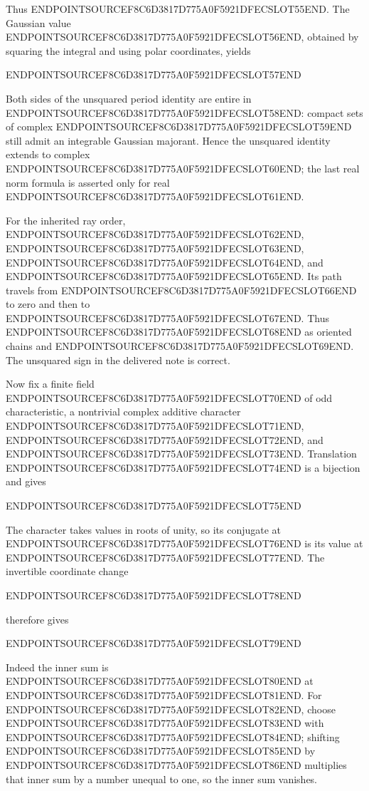 Thus ENDPOINTSOURCEF8C6D3817D775A0F5921DFECSLOT55END. The Gaussian value ENDPOINTSOURCEF8C6D3817D775A0F5921DFECSLOT56END, obtained by squaring the integral and using polar coordinates, yields

ENDPOINTSOURCEF8C6D3817D775A0F5921DFECSLOT57END

Both sides of the unsquared period identity are entire in ENDPOINTSOURCEF8C6D3817D775A0F5921DFECSLOT58END: compact sets of complex ENDPOINTSOURCEF8C6D3817D775A0F5921DFECSLOT59END still admit an integrable Gaussian majorant. Hence the unsquared identity extends to complex ENDPOINTSOURCEF8C6D3817D775A0F5921DFECSLOT60END; the last real norm formula is asserted only for real ENDPOINTSOURCEF8C6D3817D775A0F5921DFECSLOT61END.

For the inherited ray order, ENDPOINTSOURCEF8C6D3817D775A0F5921DFECSLOT62END, ENDPOINTSOURCEF8C6D3817D775A0F5921DFECSLOT63END, ENDPOINTSOURCEF8C6D3817D775A0F5921DFECSLOT64END, and ENDPOINTSOURCEF8C6D3817D775A0F5921DFECSLOT65END. Its path travels from ENDPOINTSOURCEF8C6D3817D775A0F5921DFECSLOT66END to zero and then to ENDPOINTSOURCEF8C6D3817D775A0F5921DFECSLOT67END. Thus ENDPOINTSOURCEF8C6D3817D775A0F5921DFECSLOT68END as oriented chains and ENDPOINTSOURCEF8C6D3817D775A0F5921DFECSLOT69END. The unsquared sign in the delivered note is correct.

Now fix a finite field ENDPOINTSOURCEF8C6D3817D775A0F5921DFECSLOT70END of odd characteristic, a nontrivial complex additive character ENDPOINTSOURCEF8C6D3817D775A0F5921DFECSLOT71END, ENDPOINTSOURCEF8C6D3817D775A0F5921DFECSLOT72END, and ENDPOINTSOURCEF8C6D3817D775A0F5921DFECSLOT73END. Translation ENDPOINTSOURCEF8C6D3817D775A0F5921DFECSLOT74END is a bijection and gives

ENDPOINTSOURCEF8C6D3817D775A0F5921DFECSLOT75END

The character takes values in roots of unity, so its conjugate at ENDPOINTSOURCEF8C6D3817D775A0F5921DFECSLOT76END is its value at ENDPOINTSOURCEF8C6D3817D775A0F5921DFECSLOT77END. The invertible coordinate change

ENDPOINTSOURCEF8C6D3817D775A0F5921DFECSLOT78END

therefore gives

ENDPOINTSOURCEF8C6D3817D775A0F5921DFECSLOT79END

Indeed the inner sum is ENDPOINTSOURCEF8C6D3817D775A0F5921DFECSLOT80END at ENDPOINTSOURCEF8C6D3817D775A0F5921DFECSLOT81END. For ENDPOINTSOURCEF8C6D3817D775A0F5921DFECSLOT82END, choose ENDPOINTSOURCEF8C6D3817D775A0F5921DFECSLOT83END with ENDPOINTSOURCEF8C6D3817D775A0F5921DFECSLOT84END; shifting ENDPOINTSOURCEF8C6D3817D775A0F5921DFECSLOT85END by ENDPOINTSOURCEF8C6D3817D775A0F5921DFECSLOT86END multiplies that inner sum by a number unequal to one, so the inner sum vanishes.

